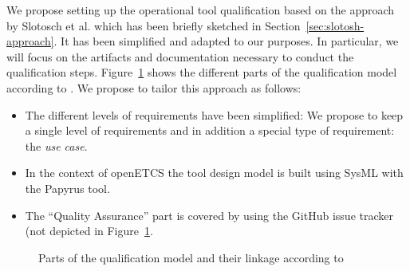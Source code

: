 We propose setting up the operational tool qualification based on the approach by Slotosch et al. which has been briefly sketched in Section~\ref{sec:slotosh-approach}. It has been simplified and adapted to our purposes. In particular, we will focus on the artifacts and documentation necessary to conduct the qualification steps. Figure~\ref{fig:qualification-models-linkage} shows the different parts of the qualification model according to \cite{slotosch_model-based_2012}. We propose to tailor this approach as follows:
\begin{itemize}
    \item The different levels of requirements have been simplified: We propose to keep a single level of requirements and in addition a special type of requirement: the \emph{use case}.
    \item In the context of openETCS the tool design model is built using SysML with the Papyrus tool.
	\item The ``Quality Assurance'' part is covered by using the GitHub issue tracker (not depicted in Figure~\ref{fig:qualification-models-linkage}.
\end{itemize}

\begin{figure}[htbp]
\begin{center}
\end{center}
\caption{Parts of the qualification model and their linkage according to \cite{slotosch_model-based_2012}}
\label{fig:qualification-models-linkage}
\end{figure}

